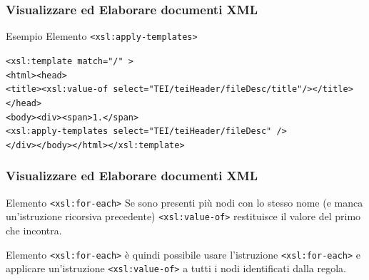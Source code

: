 \begin{frame}
    \frametitle{Visualizzare ed Elaborare documenti XML}
    \addtocounter{nframe}{1}
    

     \begin{block}{Esempio Elemento \texttt{<xsl:apply-templates>}}
        
        \texttt{<xsl:template match="/" >}
        \\\texttt{<html><head>}
        \\\texttt{<title><xsl:value-of select="TEI/teiHeader/fileDesc/title"/></title></head>}
        \\\texttt{<body><div><span>1.</span>}
        \\\texttt{<xsl:apply-templates select="TEI/teiHeader/fileDesc" />}
        \\\texttt{</div></body></html></xsl:template>}

     \end{block}
    
\end{frame}



\begin{frame}
    \frametitle{Visualizzare ed Elaborare documenti XML}
    \addtocounter{nframe}{1}
    

     \begin{block}{Elemento \texttt{<xsl:for-each>}}
        Se sono presenti più nodi con lo stesso nome (e manca un’istruzione ricorsiva precedente) \texttt{<xsl:value-of>} restituisce il valore del primo che incontra.
     \end{block}

     \begin{block}{Elemento \texttt{<xsl:for-each>}}
        è quindi possibile usare l’istruzione \texttt{<xsl:for-each>} e applicare un’istruzione \texttt{<xsl:value-of>} a tutti i nodi identificati dalla regola.
     \end{block}

\end{frame}

